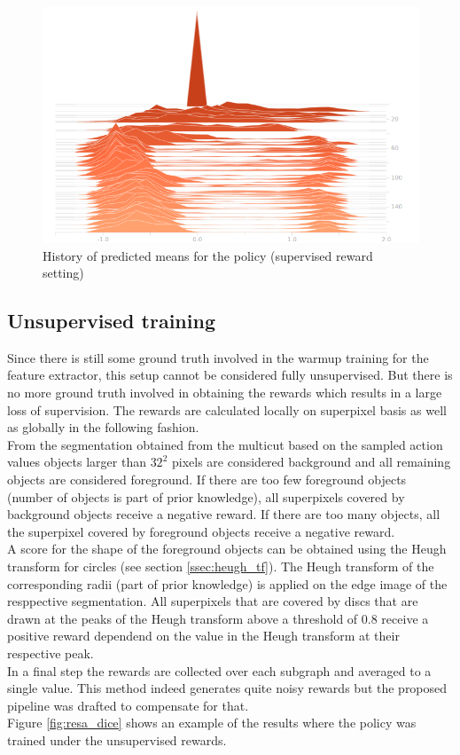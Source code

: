 \begin{figure}[ht!]
	\centering
	\includegraphics[width=.7\textwidth]{figures/plots/logit_means_hist.png}
	\caption{History of predicted means for the policy (supervised reward setting)}
	\label{fig:pred_means}
\end{figure}

\subsection{Unsupervised training}

Since there is still some ground truth involved in the warmup training for the feature extractor, this setup cannot be considered fully unsupervised. But there is no more ground truth involved in obtaining the rewards which results in a large loss of supervision. The rewards are calculated locally on superpixel basis as well as globally in the following fashion.\\
From the segmentation obtained from the multicut based on the sampled action values objects larger than $32^2$ pixels are considered background and all remaining objects are considered foreground. If there are too few foreground objects (number of objects is part of prior knowledge), all superpixels covered by background objects receive a negative reward. If there are too many objects, all the superpixel covered by foreground objects receive a negative reward.\\
A score for the shape of the foreground objects can be obtained using the Heugh transform for circles (see section \ref{ssec:heugh_tf}). The Heugh transform of the corresponding radii (part of prior knowledge) is applied on the edge image of the resppective segmentation. All superpixels that are covered by discs that are drawn at the peaks of the Heugh transform above a threshold of $0.8$ receive a positive reward dependend on the value in the Heugh transform at their respective peak.\\
In a final step the rewards are collected over each subgraph and averaged to a single value. This method indeed generates quite noisy rewards but the proposed pipeline was drafted to compensate for that.\\
Figure \ref{fig:resa_dice} shows an example of the results where the policy was trained under the unsupervised rewards.

